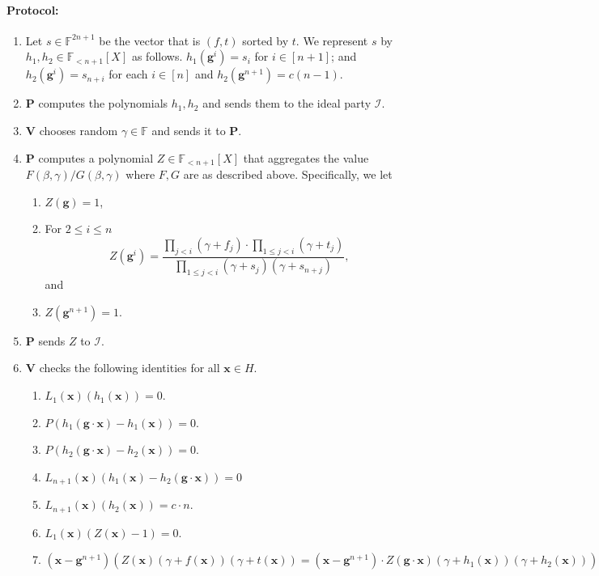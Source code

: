 \documentclass[11pt]{article} %
\newcommand{\F}{\ensuremath{\mathbb F}\xspace}
\newcommand{\dom}{\ensuremath{H}\xspace}
\newcommand{\prv}{\ensuremath{\mathsf{\mathbf{P}}}\xspace}
\newcommand{\prvpoly}{\ensuremath{\prv}\xspace}
\newcommand{\verpoly}{\ensuremath{\ver}\xspace}%
\newcommand{\ideal}{\ensuremath{\mathcal{I}}\xspace}
\newcommand{\ver}{\ensuremath{\mathsf{\mathbf{V}}}\xspace}
\newcommand{\hgen}{\ensuremath{\mathbf{g}}\xspace}
\newcommand{\cosetgen}{\ensuremath{\mathbf{\kappa}}\xspace}
\newcommand{\polysofdeg}[1]{\ensuremath{\F_{< #1}[X]}\xspace}
\newcommand{\sone}{\ensuremath{ h_1}\xspace}
\newcommand{\stwo}{\ensuremath{ h_{2}}\xspace}
\newcommand{\X}{\ensuremath{ {\mathbf{x}}}\xspace}
\begin{document}
\paragraph{Protocol:}
\begin{enumerate}
 \item Let $s\in \F^{2n+1}$ be the vector that is $(f,t)$ sorted by $t$. We represent $s$ by $\sone,\stwo \in \polysofdeg{n+1}$ as follows.
$\sone (\hgen^i) = s_i$ for $i\in [n+1]$; and $\stwo(\hgen ^i)= s_{n+i}$ for each $i\in [n]$ and $\stwo(\hgen^{n+1})=c(n-1)$.
 
 \item \prvpoly computes the polynomials $\sone,\stwo$ and sends them to the ideal party \ideal.
 \item \verpoly chooses random $\gamma \in \F$ and sends it to \prvpoly.
 \item \prvpoly computes a polynomial $Z\in \polysofdeg{n+1}$ that aggregates the value $F(\beta,\gamma)/G(\beta,\gamma)$ where $F,G$ are as described above. Specifically, we let
\begin{enumerate}
 \item  $Z(\hgen) = 1$,
\item For $2\leq i \leq n$
\[Z(\hgen^{i})= \frac{\prod_{j < i} (\gamma + f_j)\cdot \prod_{1\leq j < i} (\gamma+ t_j)}{\prod_{1\leq j <i} (\gamma + s_j)(\gamma+ s_{n+j})},\]
 and
\item $Z(\hgen^{n+1})=1$.
\end{enumerate}
 \item \prvpoly sends $Z$ to \ideal.
 \item  \verpoly checks the following identities for all $\X \in H$.
 \begin{enumerate}
\item \label{step:rangefirst} $L_1(\X)(\sone(\X)) = 0$.
\item$P\left(\sone(\hgen\cdot \X)- \sone(\X)\right)= 0$.
\item $P\left(\stwo(\hgen\cdot  \X)- \stwo(\X)\right)= 0$.
  \item\label{check:consisttwo} $L_{n+1}(\X)(\sone(\X)-\stwo(\hgen\cdot \X ))= 0$
\item \label{step:rangefirstlast}$L_{n+1}(\X)(\stwo(\X)) = c\cdot n$.
  \item \label{step:rangepermfirst}$L_1(\X)(Z(\X)-1)= 0$.
  \item 
  \[(\X-\hgen^{n+1}) (Z(\X) (\gamma + f(\X))(\gamma+ t(\X))= (\X-\hgen^{n+1})\cdot  Z(\hgen \cdot \X)(\gamma+ \sone(\X))(\gamma+ \stwo(\X))) \]


\end{enumerate}
\end{enumerate}
\end{document}
